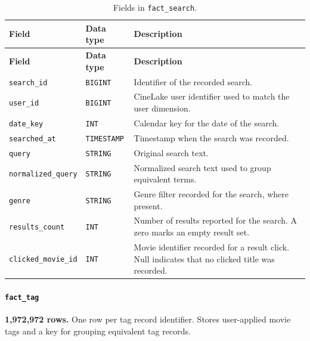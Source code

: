 \documentclass[a4paper,12pt]{article}
\newcommand{\dbsep}{\_\allowbreak}
\begin{document}
\begingroup
\small
\setlength{\tabcolsep}{4pt}
\renewcommand{\arraystretch}{1.1}
\begin{longtable}{@{}>{\raggedright\arraybackslash}p{}
                    >{\raggedright\arraybackslash}p{}
                    >{\raggedright\arraybackslash}p{}@{}}
\caption{Fields in \texttt{fact\dbsep search}.}\\
\toprule
\textbf{Field} & \textbf{Data type} & \textbf{Description}\\
\midrule
\endfirsthead
\toprule
\textbf{Field} & \textbf{Data type} & \textbf{Description}\\
\midrule
\endhead
\bottomrule
\endfoot
\texttt{search\dbsep id} & \texttt{BIGINT} & Identifier of the recorded search.\\
\texttt{user\dbsep id} & \texttt{BIGINT} & CineLake user identifier used to match the user dimension.\\
\texttt{date\dbsep key} & \texttt{INT} & Calendar key for the date of the search.\\
\texttt{searched\dbsep at} & \texttt{TIMESTAMP} & Timestamp when the search was recorded.\\
\texttt{query} & \texttt{STRING} & Original search text.\\
\texttt{normalized\dbsep query} & \texttt{STRING} & Normalized search text used to group equivalent terms.\\
\texttt{genre} & \texttt{STRING} & Genre filter recorded for the search, where present.\\
\texttt{results\dbsep count} & \texttt{INT} & Number of results reported for the search. A zero marks an empty result set.\\
\texttt{clicked\dbsep movie\dbsep id} & \texttt{INT} & Movie identifier recorded for a result click. Null indicates that no clicked title was recorded.\\
\end{longtable}
\endgroup

\paragraph{\texttt{fact\dbsep tag}}
\textbf{1,972,972 rows.} One row per tag record identifier.
Stores user-applied movie tags and a key for grouping equivalent tag records.
\end{document}
